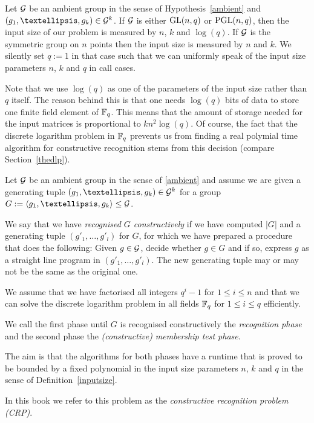 \begin{Def}
\label{inputsize}
Let $\mathcal{G}$ be an ambient group in the sense of Hypothesis~\ref{ambient}
and $(g_1, \ldots, g_k) \in \GG^k$. If $\mathcal{G}$ is either $\GL(n,q)$ or
$\PGL(n,q)$, then the input size of our problem is measured by $n$, $k$
and $\log(q)$. If $\mathcal{G}$ is the symmetric group on $n$ points then the
input size is measured by $n$ and $k$. We silently set $q := 1$ in that
case such that we can uniformly speak of the input size parameters $n$, $k$
and $q$ in call cases.
\end{Def}

\begin{Rem}
Note that we use $\log(q)$ as one of the parameters of the input size
rather than $q$ itself. The reason behind this is that one needs
$\log(q)$ bits of data to store one finite field element of $\mathbb{F}_q$.
This means that the amount of storage needed for the input matrices is
proportional to $kn^2\log(q)$. Of course, the fact that the discrete
logarithm problem in $\mathbb{F}_q$ prevents us from finding a real polymial
time algorithm for constructive recognition stems from this decision
(compare Section~\ref{thedlp}).
\end{Rem}

\begin{Problem}
\label{ProbCR2}
Let $\mathcal{G}$ be an ambient group in the sense of \ref{ambient} and 
assume we are given a generating tuple $(g_1, \ldots, g_k) \in
\GG^k$ for a group $G := \left< g_1, \ldots, g_k \right> \le \GG$. 

We say that we have \emph{recognised $G$ constructively} if we have 
computed $|G|$ and a
generating tuple $( g'_1, \ldots, g'_l )$ for $G$, for which we have
prepared a procedure that does the following: Given $g \in \mathcal{G}$,
decide whether $g \in G$ and if so, express $g$ as a straight line program
in $(g'_1, \ldots, g'_l)$. The new generating tuple may or may not be the
same as the original one.

We assume that we have factorised all integers $q^i-1$ for $1 \le i \le n$
and that we can solve the discrete logarithm problem in all fields $\mathbb{F}_q$
for $1 \le i \le q$ efficiently. 

We call the first phase until $G$ is
recognised constructively the \emph{recognition phase} and the second
phase the \emph{(constructive) membership test phase}.

The aim is that the algorithms for both phases have a runtime that is proved
to be bounded by a fixed polynomial in the input size parameters $n$, $k$
and $q$ in the sense of Definition~\ref{inputsize}.

In this book we refer to this problem as the \emph{constructive recognition
problem (CRP)}.
\proofend
\end{Problem}

